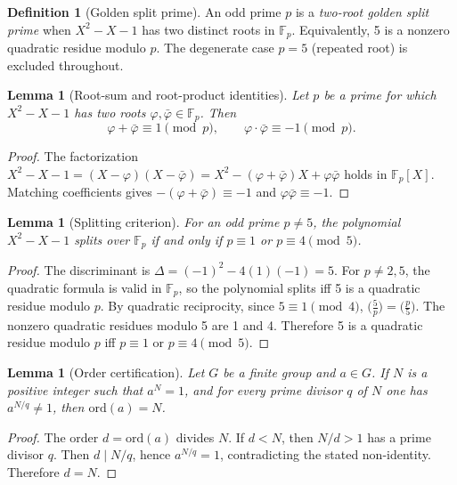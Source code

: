 \documentclass[12pt,oneside]{article}
\theoremstyle{principia}
\newtheorem{lemma}[theorem]{Lemma}
\theoremstyle{definition}
\newtheorem{definition}[theorem]{Definition}
\theoremstyle{remark}
\providecommand{\FF}{\mathbb{F}}
\providecommand{\vp}{\varphi}
\providecommand{\vpbar}{\bar{\varphi}}
\begin{document}
\begin{definition}[Golden split prime]
An odd prime $p$ is a \emph{two-root golden split prime} when $X^2 - X - 1$ has two distinct roots in $\FF_p$. Equivalently, 5 is a nonzero quadratic residue modulo $p$. The degenerate case $p = 5$ (repeated root) is excluded throughout.
\end{definition}

\begin{lemma}[Root-sum and root-product identities]\label{lem:rootprod}
Let $p$ be a prime for which $X^2 - X - 1$ has two roots $\vp, \vpbar \in \FF_p$. Then
\[
\vp + \vpbar \equiv 1 \pmod{p}, \qquad \vp \cdot \vpbar \equiv -1 \pmod{p}.
\]
\end{lemma}

\begin{proof}
The factorization $X^2 - X - 1 = (X - \vp)(X - \vpbar) = X^2 - (\vp + \vpbar)X + \vp\vpbar$ holds in $\FF_p[X]$. Matching coefficients gives $-(\vp + \vpbar) \equiv -1$ and $\vp\vpbar \equiv -1$. \qedhere
\end{proof}

\begin{lemma}[Splitting criterion]\label{lem:splitting}
For an odd prime $p \neq 5$, the polynomial $X^2 - X - 1$ splits over $\FF_p$ if and only if $p \equiv 1$ or $p \equiv 4 \pmod{5}$.
\end{lemma}

\begin{proof}
The discriminant is $\Delta = (-1)^2 - 4(1)(-1) = 5$. For $p \neq 2, 5$, the quadratic formula is valid in $\FF_p$, so the polynomial splits iff 5 is a quadratic residue modulo $p$. By quadratic reciprocity, since $5 \equiv 1 \pmod{4}$, $\bigl(\frac{5}{p}\bigr) = \bigl(\frac{p}{5}\bigr)$. The nonzero quadratic residues modulo 5 are 1 and 4. Therefore 5 is a quadratic residue modulo $p$ iff $p \equiv 1$ or $p \equiv 4 \pmod{5}$. \qedhere
\end{proof}

\begin{lemma}[Order certification]\label{lem:order}
Let $G$ be a finite group and $a \in G$. If $N$ is a positive integer such that $a^N = 1$, and for every prime divisor $q$ of $N$ one has $a^{N/q} \neq 1$, then $\mathrm{ord}(a) = N$.
\end{lemma}

\begin{proof}
The order $d = \mathrm{ord}(a)$ divides $N$. If $d < N$, then $N/d > 1$ has a prime divisor $q$. Then $d \mid N/q$, hence $a^{N/q} = 1$, contradicting the stated non-identity. Therefore $d = N$. \qedhere
\end{proof}
\end{document}
